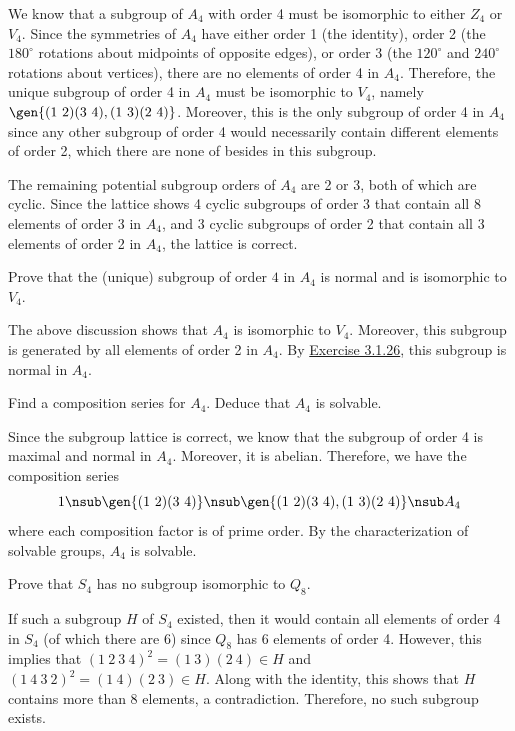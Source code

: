 \begin{problems}
\begin{sol}
        We know that a subgroup of $A_4$ with order 4 must be isomorphic to either $Z_4$ or $V_4$. Since the symmetries of $A_4$ have either order 1 (the identity), order 2 (the $180^\circ$ rotations about midpoints of opposite edges), or order 3 (the $120^\circ$ and $240^\circ$ rotations about vertices), there are no elements of order 4 in $A_4$. Therefore, the unique subgroup of order 4 in $A_4$ must be isomorphic to $V_4$, namely $\gen{(1\ 2)(3\ 4), (1\ 3)(2\ 4)}$. Moreover, this is the only subgroup of order 4 in $A_4$ since any other subgroup of order 4 would necessarily contain different elements of order 2, which there are none of besides in this subgroup.

        The remaining potential subgroup orders of $A_4$ are 2 or 3, both of which are cyclic. Since the lattice shows 4 cyclic subgroups of order 3 that contain all 8 elements of order 3 in $A_4$, and 3 cyclic subgroups of order 2 that contain all 3 elements of order 2 in $A_4$, the lattice is correct.
    \end{sol}
    \item \label{ex3.5.9} Prove that the (unique) subgroup of order $4$ in $A_4$ is normal and is isomorphic to $V_4$.
    \begin{sol}
        The above discussion shows that $A_4$ is isomorphic to $V_4$. Moreover, this subgroup is generated by all elements of order 2 in $A_4$. By \hyperref[ex3.1.26]{Exercise 3.1.26}, this subgroup is normal in $A_4$.
    \end{sol}
    \item Find a composition series for $A_4$. Deduce that $A_4$ is solvable.
    \begin{sol}
        Since the subgroup lattice is correct, we know that the subgroup of order 4 is maximal and normal in $A_4$. Moreover, it is abelian. Therefore, we have the composition series
        \[1 \nsub \gen{(1\ 2)(3\ 4)} \nsub \gen{(1\ 2)(3\ 4), (1\ 3)(2\ 4)} \nsub A_4\]
        where each composition factor is of prime order. By the characterization of solvable groups, $A_4$ is solvable.
    \end{sol}
    \item Prove that $S_4$ has no subgroup isomorphic to $Q_8$.
    \begin{sol}
        If such a subgroup $H$ of $S_4$ existed, then it would contain all elements of order 4 in $S_4$ (of which there are 6) since $Q_8$ has 6 elements of order 4. However, this implies that $(1\ 2\ 3\ 4)^2 = (1\ 3)(2\ 4) \in H$ and $(1\ 4\ 3\ 2)^2 = (1\ 4)(2\ 3) \in H$. Along with the identity, this shows that $H$ contains more than 8 elements, a contradiction. Therefore, no such subgroup exists.

\end{sol}
\end{problems}
